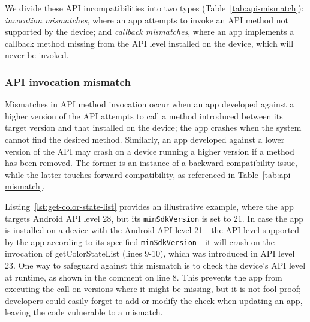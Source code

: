 We divide these API incompatibilities into two types
(Table~\ref{tab:api-mismatch}): {\it invocation
mismatches}, where an app attempts to invoke an API
method not supported by the device; and {\it callback
mismatches}, where an app implements a callback method
missing from the API level installed on the device,
which will never be invoked.

\subsubsection{API invocation mismatch}

Mismatches in API method invocation occur when an app
developed against a higher version of the API attempts to
call a method introduced between its target version and that
installed on the device; the app crashes when the system
cannot find the desired method. Similarly, an app developed
against a lower version of the API may crash on a device
running a higher version if a method has been removed.
The former is an instance of a backward-compatibility issue, while the latter touches forward-compatibility, as referenced in Table~\ref{tab:api-mismatch}.

\begin{figure}[b]%
    
\end{figure}

 

Listing~\ref{lst:get-color-state-list} provides an illustrative example, where
the app targets Android API level 28, but its {\tt minSdkVersion} is set to 21.
In case the app is installed on a device with the Android API level 
21---the API level supported by the app according to 
its specified {\tt minSdkVersion}---it will crash on 
the invocation of {\sf getColorStateList}
(lines 9-10), which was introduced in API level 23.
One way to safeguard against this mismatch is to check the device's
API level at runtime, as shown in the comment on line 8.
This prevents the app from executing the call on versions
where it might be missing, but it is not fool-proof;
developers could easily forget to add or modify the check
when updating an app, leaving the code vulnerable to a
mismatch.


